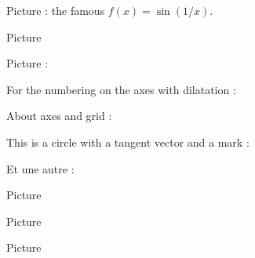 
Picture  : the famous \( f(x)=\sin(1/x)\).
\begin{center}
   
\end{center}
   


Picture 
\begin{center}
   
\end{center}
   


Picture : 
\begin{center}
   
\end{center}
   

For the numbering on the axes with dilatation : 
\begin{center}
   
\end{center}




About axes and grid : 
\begin{center}
   
\end{center}
   


This is a circle with a tangent vector and a mark :

\begin{center}
    
\end{center}


Et une autre : 

\begin{center}
   
\end{center}


Picture 
\begin{center}
   
\end{center}
   

Picture 
\begin{center}
   
\end{center}


\clearpage

Picture 
\newcommand{\CaptionFigOMPAooMbyOIqeA}{Marks are correct.}


